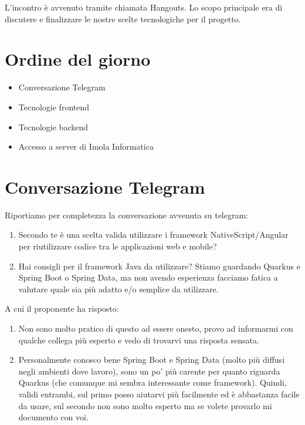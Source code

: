 \documentclass{article}
\begin{document}
L'incontro è avvenuto tramite chiamata Hangouts.
Lo scopo principale era di discutere e finalizzare le nostre scelte tecnologiche per il progetto.

\section{Ordine del giorno}%
\label{sec:ordine_del_giorno}

\begin{itemize}
  \item Conversazione Telegram
  \item Tecnologie frontend
  \item Tecnologie backend
  \item Accesso a server di Imola Informatica
\end{itemize}

\section{Conversazione Telegram}%
\label{sec:conversazione_telegram}

Riportiamo per completezza la conversazione avvenuta su telegram:

\begin{enumerate}
  \item Secondo te è una scelta valida utilizzare i framework NativeScript/Angular per riutilizzare codice tra le applicazioni web e mobile?
  \item Hai consigli per il framework Java da utilizzare? Stiamo guardando Quarkus e Spring Boot o Spring Data, ma non avendo esperienza facciamo fatica a valutare quale sia più adatto e/o semplice da utilizzare.
\end{enumerate}

A cui il proponente ha risposto:

\begin{enumerate}
  \item Non sono molto pratico di questo ad essere onesto, provo ad informarmi con qualche collega più esperto e vedo di trovarvi una risposta sensata.
  \item Personalmente conosco bene Spring Boot e Spring Data (molto più diffusi negli ambienti dove lavoro), sono un po' più carente per quanto riguarda Quarkus (che comunque mi sembra interessante come framework).
        Quindi, validi entrambi, sul primo posso aiutarvi più facilmente ed è abbastanza facile da usare, sul secondo non sono molto esperto ma se volete provarlo mi documento con voi.
\end{enumerate}
\end{document}
